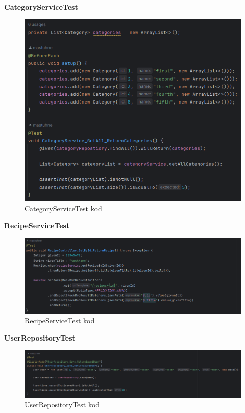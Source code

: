 			\eject
			\noindent\textbf{CategoryServiceTest}
			\begin{figure}[H]
				\includegraphics[scale=0.5]{slike/category_service_test.png}
				\centering
				\caption{CategoryServiceTest kod}
				\label{fig:cattest}
			\end{figure}

			\noindent\textbf{RecipeServiceTest}
			\begin{figure}[H]
				\includegraphics[scale=0.5]{slike/recipe_controller_test.png}
				\centering
				\caption{RecipeServiceTest kod}
				\label{fig:recest}
			\end{figure}

			\eject
			\noindent\textbf{UserRepositoryTest}
			\begin{figure}[H]
				\includegraphics[scale=0.4]{slike/user_repository_test.png}
				\centering
				\caption{UserRepositoryTest kod}
				\label{fig:userretest}
			\end{figure}

